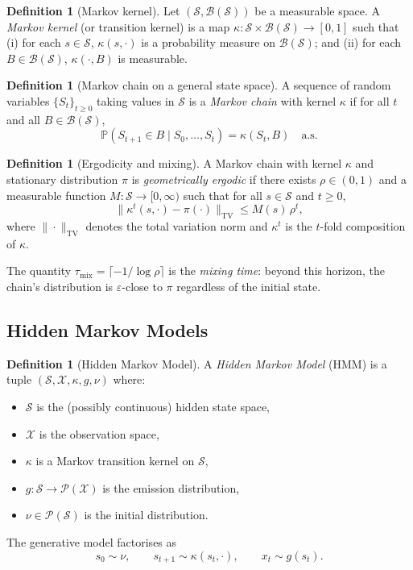 \documentclass[11pt,a4paper]{article}
\theoremstyle{plain}
\theoremstyle{definition}
\newtheorem{definition}[theorem]{Definition}
\theoremstyle{remark}
\newcommand{\Prob}{\mathbb{P}}
\newcommand{\cS}{\mathcal{S}}
\newcommand{\cX}{\mathcal{X}}
\newcommand{\cP}{\mathcal{P}}
\newcommand{\cB}{\mathcal{B}}
\newcommand{\TV}{\mathrm{TV}}
\begin{document}
\begin{definition}[Markov kernel]
Let $(\cS, \cB(\cS))$ be a measurable space. A \emph{Markov kernel} (or
transition kernel) is a map $\kappa: \cS \times \cB(\cS) \to [0,1]$ such that
(i) for each $s \in \cS$, $\kappa(s, \cdot)$ is a probability measure on
$\cB(\cS)$; and (ii) for each $B \in \cB(\cS)$, $\kappa(\cdot, B)$ is
measurable.
\end{definition}

\begin{definition}[Markov chain on a general state space]
A sequence of random variables $\{S_t\}_{t \geq 0}$ taking values in $\cS$ is a
\emph{Markov chain} with kernel $\kappa$ if for all $t$ and all
$B \in \cB(\cS)$,
\[
  \Prob(S_{t+1} \in B \mid S_0, \ldots, S_t) = \kappa(S_t, B) \quad \text{a.s.}
\]
\end{definition}

\begin{definition}[Ergodicity and mixing]\label{def:ergodic}
A Markov chain with kernel $\kappa$ and stationary distribution $\pi$ is
\emph{geometrically ergodic} if there exists $\rho \in (0,1)$ and a measurable
function $M: \cS \to [0,\infty)$ such that for all $s \in \cS$ and $t \geq 0$,
\[
  \|\kappa^t(s, \cdot) - \pi(\cdot)\|_{\TV} \leq M(s)\, \rho^t,
\]
where $\|\cdot\|_{\TV}$ denotes the total variation norm and $\kappa^t$ is the
$t$-fold composition of $\kappa$.
\end{definition}

The quantity $\tau_{\mathrm{mix}} = \lceil -1/\log \rho \rceil$ is the
\emph{mixing time}: beyond this horizon, the chain's distribution is
$\varepsilon$-close to $\pi$ regardless of the initial state.

\subsection{Hidden Markov Models}

\begin{definition}[Hidden Markov Model]
A \emph{Hidden Markov Model} (HMM) is a tuple $(\cS, \cX, \kappa, g, \nu)$
where:
\begin{itemize}[nosep]
  \item $\cS$ is the (possibly continuous) hidden state space,
  \item $\cX$ is the observation space,
  \item $\kappa$ is a Markov transition kernel on $\cS$,
  \item $g: \cS \to \cP(\cX)$ is the emission distribution,
  \item $\nu \in \cP(\cS)$ is the initial distribution.
\end{itemize}
The generative model factorises as
\[
  s_0 \sim \nu, \qquad
  s_{t+1} \sim \kappa(s_t, \cdot), \qquad
  x_t \sim g(s_t).
\]
\end{definition}
\end{document}
